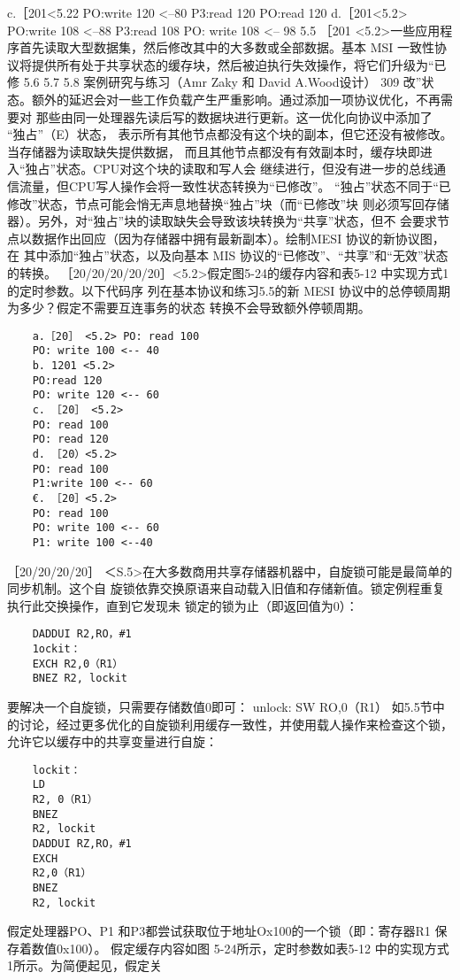c.［201<5.22
PO:write 120 <--80
P3:read 120
PO:read 120
d.［201<5.2>
PO:write 108 <--88
P3:read 108
PO: write 108 <-- 98
5.5 ［201 <5.2>一些应用程序首先读取大型数据集，然后修改其中的大多数或全部数据。基本 MSI
一致性协议将提供所有处于共享状态的缓存块，然后被迫执行失效操作，将它们升级为“已修
5.6
5.7
5.8
案例研究与练习（Amr Zaky 和 David A.Wood设计）
309
改”状态。额外的延迟会对一些工作负载产生严重影响。通过添加一项协议优化，不再需要对
那些由同一处理器先读后写的数据块进行更新。这一优化向协议中添加了 “独占”（E）状态，
表示所有其他节点都没有这个块的副本，但它还没有被修改。当存储器为读取缺失提供数据，
而且其他节点都没有有效副本时，缓存块即进入“独占”状态。CPU对这个块的读取和写人会
继续进行，但没有进一步的总线通信流量，但CPU写人操作会将一致性状态转换为“已修改”。
“独占”状态不同于“已修改”状态，节点可能会悄无声息地替换“独占”块（而“已修改”块
则必须写回存储器）。另外，对“独占”块的读取缺失会导致该块转换为“共享”状态，但不
会要求节点以数据作出回应（因为存储器中拥有最新副本）。绘制MESI 协议的新协议图，在
其中添加“独占”状态，以及向基本 MIS 协议的“已修改”、“共享”和“无效”状态的转换。
［20/20/20/20/20］<5.2>假定图5-24的缓存内容和表5-12 中实现方式1的定时参数。以下代码序
列在基本协议和练习5.5的新 MESI 协议中的总停顿周期为多少？假定不需要互连事务的状态
转换不会导致额外停顿周期。
\begin{verbatim}
    a.［20］ <5.2> PO: read 100
    PO: write 100 <-- 40
    b. 1201 <5.2>
    PO:read 120
    PO: write 120 <-- 60
    c. ［20］ <5.2>
    PO: read 100
    PO: read 120
    d. ［20）<5.2>
    PO: read 100
    P1:write 100 <-- 60
    €. ［20］<5.2>
    PO: read 100
    PO: write 100 <-- 60
    P1: write 100 <--40
\end{verbatim}
［20/20/20/20］ ＜S.5>在大多数商用共享存储器机器中，自旋锁可能是最简单的同步机制。这个自
旋锁依靠交换原语来自动载入旧值和存储新值。锁定例程重复执行此交换操作，直到它发现未
锁定的锁为止（即返回值为0）：
\begin{verbatim}
    DADDUI R2,RO，#1
    1ockit：
    EXCH R2,0（R1）
    BNEZ R2, lockit
\end{verbatim}
要解决一个自旋锁，只需要存储数值0即可：
unlock: SW RO,0（R1）
如5.5节中的讨论，经过更多优化的自旋锁利用缓存一致性，并使用载人操作来检查这个锁，
允许它以缓存中的共享变量进行自旋：
\begin{verbatim}
    lockit：
    LD
    R2, 0（R1）
    BNEZ
    R2, lockit
    DADDUI RZ,RO，#1
    EXCH
    R2,0（R1）
    BNEZ
    R2, lockit
\end{verbatim}
假定处理器PO、P1 和P3都尝试获取位于地址Ox100的一个锁（即：寄存器R1 保存着数值0x100）。
假定缓存内容如图 5-24所示，定时参数如表5-12 中的实现方式1所示。为简便起见，假定关
